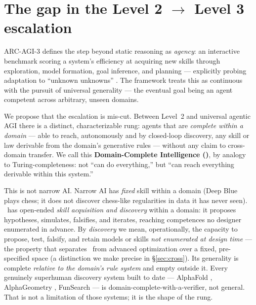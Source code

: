 \section{The gap in the Level 2 $\rightarrow$ Level 3 escalation}
\label{sec:gap}

ARC-AGI-3 defines the step beyond static reasoning as \emph{agency}: an interactive benchmark scoring a system's efficiency at acquiring new skills through exploration, model formation, goal inference, and planning --- explicitly probing adaptation to ``unknown unknowns'' \citep{arcprize2026,cholletarc2026}. The framework treats this as continuous with the pursuit of universal generality --- the eventual goal being an agent competent across arbitrary, unseen domains.

We propose that the escalation is mis-cut. Between Level~2 and universal agentic AGI there is a distinct, characterizable rung: agents that are \emph{complete within a domain} --- able to reach, autonomously and by closed-loop discovery, any skill or law derivable from the domain's generative rules --- without any claim to cross-domain transfer. We call this \textbf{Domain-Complete Intelligence (\DCI)}, by analogy to Turing-completeness: not ``can do everything,'' but ``can reach everything derivable within this system.''

This is not narrow AI. Narrow AI has \emph{fixed} skill within a domain (Deep Blue plays chess; it does not discover chess-like regularities in data it has never seen). \DCI\ has open-ended \emph{skill acquisition and discovery} within a domain: it proposes hypotheses, simulates, falsifies, and iterates, reaching competences no designer enumerated in advance. By \emph{discovery} we mean, operationally, the capacity to propose, test, falsify, and retain models or skills \emph{not enumerated at design time} --- the property that separates \DCI\ from advanced optimization over a fixed, pre-specified space (a distinction we make precise in \S\ref{sec:cross}). Its generality is complete \emph{relative to the domain's rule system} and empty outside it. Every genuinely superhuman discovery system built to date --- AlphaFold \citep{jumper2021}, AlphaGeometry \citep{trinh2024}, FunSearch \citep{romera2024} --- is domain-complete-with-a-verifier, not general. That is not a limitation of those systems; it is the shape of the rung.
